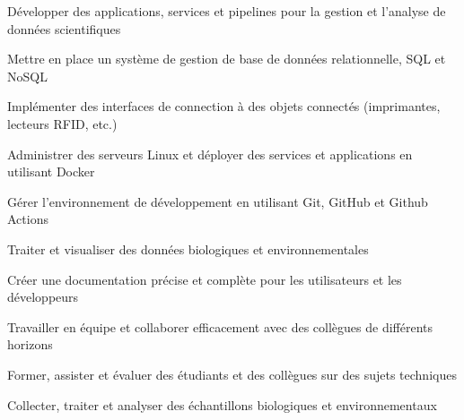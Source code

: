 

\begin{cvskills}

  \begin{minipage}[t]{0.45\textwidth}
    \cvskill
      {Développer des applications, services et pipelines pour la gestion et l'analyse de données scientifiques}
  \end{minipage}\hfill
  \begin{minipage}[t]{0.45\textwidth}
    \cvskill
      {Mettre en place un système de gestion de base de données relationnelle, SQL et NoSQL}
  \end{minipage}

  \begin{minipage}[t]{0.45\textwidth}
    \cvskill
      {Implémenter des interfaces de connection à des objets connectés (imprimantes, lecteurs RFID, etc.)}
  \end{minipage}\hfill
  \begin{minipage}[t]{0.45\textwidth}
    \cvskill
      {Administrer des serveurs Linux et déployer des services et applications en utilisant Docker}
  \end{minipage}

  \begin{minipage}[t]{0.45\textwidth}
    \cvskill
      {Gérer l'environnement de développement en utilisant Git, GitHub et Github Actions}
  \end{minipage}\hfill
  \begin{minipage}[t]{0.45\textwidth}
    \cvskill
      {Traiter et visualiser des données biologiques et environnementales}
  \end{minipage}

  \begin{minipage}[t]{0.45\textwidth}
    \cvskill
      {Créer une documentation précise et complète pour les utilisateurs et les développeurs}
  \end{minipage}\hfill
  \begin{minipage}[t]{0.45\textwidth}
    \cvskill
      {Travailler en équipe et collaborer efficacement avec des collègues de différents horizons}
  \end{minipage}

  \begin{minipage}[t]{0.45\textwidth}
    \cvskill
      {Former, assister et évaluer des étudiants et des collègues sur des sujets techniques}
  \end{minipage}\hfill
  \begin{minipage}[t]{0.45\textwidth}
    \cvskill
      {Collecter, traiter et analyser des échantillons biologiques et environnementaux}
  \end{minipage}

\end{cvskills}